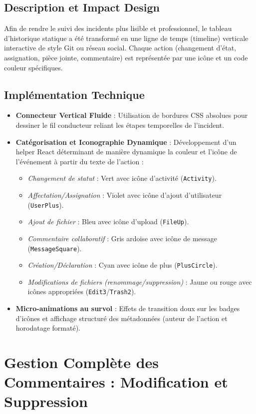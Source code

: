 \documentclass[12pt,a4paper]{article}
\begin{document}
\subsection{Description et Impact Design}
Afin de rendre le suivi des incidents plus lisible et professionnel, le tableau d'historique statique a été transformé en une ligne de temps (timeline) verticale interactive de style Git ou réseau social. Chaque action (changement d'état, assignation, pièce jointe, commentaire) est représentée par une icône et un code couleur spécifiques.

\subsection{Implémentation Technique}
\begin{itemize}
    \item \textbf{Connecteur Vertical Fluide} : Utilisation de bordures CSS absolues pour dessiner le fil conducteur reliant les étapes temporelles de l'incident.
    \item \textbf{Catégorisation et Iconographie Dynamique} : Développement d'un helper React déterminant de manière dynamique la couleur et l'icône de l'événement à partir du texte de l'action :
    \begin{itemize}
        \item \textit{Changement de statut} : Vert avec icône d'activité (\texttt{Activity}).
        \item \textit{Affectation/Assignation} : Violet avec icône d'ajout d'utilisateur (\texttt{UserPlus}).
        \item \textit{Ajout de fichier} : Bleu avec icône d'upload (\texttt{FileUp}).
        \item \textit{Commentaire collaboratif} : Gris ardoise avec icône de message (\texttt{MessageSquare}).
        \item \textit{Création/Déclaration} : Cyan avec icône de plus (\texttt{PlusCircle}).
        \item \textit{Modifications de fichiers (renommage/suppression)} : Jaune ou rouge avec icônes appropriées (\texttt{Edit3}/\texttt{Trash2}).
    \end{itemize}
    \item \textbf{Micro-animations au survol} : Effets de transition doux sur les badges d'icônes et affichage structuré des métadonnées (auteur de l'action et horodatage formaté).
\end{itemize}

\section{Gestion Complète des Commentaires : Modification et Suppression}
\end{document}
